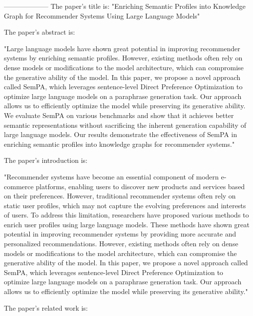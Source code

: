         --------------------
         The paper's title is: "Enriching Semantic Profiles into Knowledge Graph for Recommender Systems Using Large Language Models"

The paper's abstract is:

"Large language models have shown great potential in improving recommender systems by enriching semantic profiles. However, existing methods often rely on dense models or modifications to the model architecture, which can compromise the generative ability of the model. In this paper, we propose a novel approach called SemPA, which leverages sentence-level Direct Preference Optimization to optimize large language models on a paraphrase generation task. Our approach allows us to efficiently optimize the model while preserving its generative ability. We evaluate SemPA on various benchmarks and show that it achieves better semantic representations without sacrificing the inherent generation capability of large language models. Our results demonstrate the effectiveness of SemPA in enriching semantic profiles into knowledge graphs for recommender systems."

The paper's introduction is:

"Recommender systems have become an essential component of modern e-commerce platforms, enabling users to discover new products and services based on their preferences. However, traditional recommender systems often rely on static user profiles, which may not capture the evolving preferences and interests of users. To address this limitation, researchers have proposed various methods to enrich user profiles using large language models. These methods have shown great potential in improving recommender systems by providing more accurate and personalized recommendations. However, existing methods often rely on dense models or modifications to the model architecture, which can compromise the generative ability of the model. In this paper, we propose a novel approach called SemPA, which leverages sentence-level Direct Preference Optimization to optimize large language models on a paraphrase generation task. Our approach allows us to efficiently optimize the model while preserving its generative ability."

The paper's related work is:

